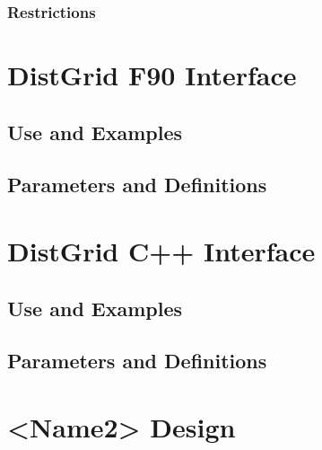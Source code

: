 \documentclass[]{article}
\begin{document}
\subsubsection{Restrictions}




\section{DistGrid F90 Interface}

\subsection{Use and Examples}




\subsection{Parameters and Definitions}








\section{DistGrid C++ Interface}

\subsection{Use and Examples}




\subsection{Parameters and Definitions}




% 
% 

\section{<Name2> Design}
\end{document}
